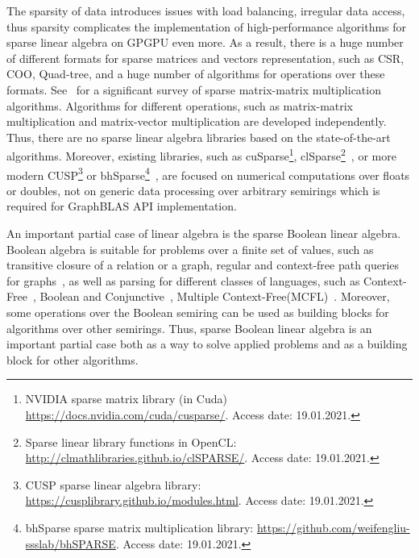 The sparsity of data introduces issues with load balancing, irregular data access, thus sparsity complicates the implementation of high-performance algorithms for sparse linear algebra on GPGPU even more.
As a result, there is a huge number of different formats for sparse matrices and vectors representation, such as CSR, COO, Quad-tree, and a huge number of algorithms for operations over these formats.
See~\cite{Gao2020ASS} for a significant survey of sparse matrix-matrix multiplication algorithms.
Algorithms for different operations, such as matrix-matrix multiplication and matrix-vector multiplication are developed independently.
Thus, there are no sparse linear algebra libraries based on the state-of-the-art algorithms.
Moreover, existing libraries, such as cuSparse\footnote{NVIDIA sparse matrix library (in Cuda) \url{https://docs.nvidia.com/cuda/cusparse/}. Access date: 19.01.2021.}, clSparse\footnote{Sparse linear library functions in OpenCL: \url{http://clmathlibraries.github.io/clSPARSE/}. Access date: 19.01.2021.}~\cite{10.1145/2909437.2909442}, or more modern CUSP\footnote{CUSP sparse linear algebra library: \url{https://cusplibrary.github.io/modules.html}. Access date: 19.01.2021.} or bhSparse\footnote{bhSparse sparse matrix multiplication library: \url{https://github.com/weifengliu-ssslab/bhSPARSE}. Access date: 19.01.2021.}~\cite{10.1016/j.jpdc.2015.06.010}, are focused on numerical computations over floats or doubles, not on generic data processing over arbitrary semirings which is required for GraphBLAS API implementation.

An important partial case of linear algebra is the sparse Boolean linear algebra.
Boolean algebra is suitable for problems over a finite set of values, such as transitive closure of a relation or a graph, regular and context-free path queries for graphs~\cite{10.1145/3210259.3210264}, as well as parsing for different classes of languages, such as Context-Free~\cite{10.1016/S0022-0000(75)80046-8}, Boolean and Conjunctive~\cite{OKHOTIN2014101}, Multiple Context-Free(MCFL)~\cite{10.5555/972525.972527}.
Moreover, some operations over the Boolean semiring can be used as building blocks for algorithms over other semirings.
Thus, sparse Boolean linear algebra is an important partial case both as a way to solve applied problems and as a building block for other algorithms.

